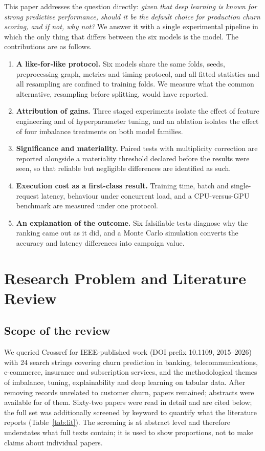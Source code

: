 \documentclass[conference]{IEEEtran}
\begin{document}
This paper addresses the question directly: \emph{given that deep learning is known for strong predictive performance, should it be the default choice for production churn scoring, and if not, why not?} We answer it with a single experimental pipeline in which the only thing that differs between the six models is the model. The contributions are as follows.
\begin{enumerate}
\item \textbf{A like-for-like protocol.} Six models share the same folds, seeds, preprocessing graph, metrics and timing protocol, and all fitted statistics and all resampling are confined to training folds. We measure what the common alternative, resampling before splitting, would have reported.
\item \textbf{Attribution of gains.} Three staged experiments isolate the effect of feature engineering and of hyperparameter tuning, and an ablation isolates the effect of four imbalance treatments on both model families.
\item \textbf{Significance and materiality.} Paired tests with multiplicity correction are reported alongside a materiality threshold declared before the results were seen, so that reliable but negligible differences are identified as such.
\item \textbf{Execution cost as a first-class result.} Training time, batch and single-request latency, behaviour under concurrent load, and a CPU-versus-GPU benchmark are measured under one protocol.
\item \textbf{An explanation of the outcome.} Six falsifiable tests diagnose why the ranking came out as it did, and a Monte Carlo simulation converts the accuracy and latency differences into campaign value.
\end{enumerate}

\section{Research Problem and Literature Review}
\subsection{Scope of the review}
We queried Crossref for IEEE-published work (DOI prefix 10.1109, 2015--2026) with 24 search strings covering churn prediction in banking, telecommunications, e-commerce, insurance and subscription services, and the methodological themes of imbalance, tuning, explainability and deep learning on tabular data. After removing records unrelated to customer churn, \LitPoolN{} papers remained; abstracts were available for \LitAbstractN{} of them. Sixty-two papers were read in detail and are cited below; the full set was additionally screened by keyword to quantify what the literature reports (Table~\ref{tab:lit}). The screening is at abstract level and therefore understates what full texts contain; it is used to show proportions, not to make claims about individual papers.
\end{document}
